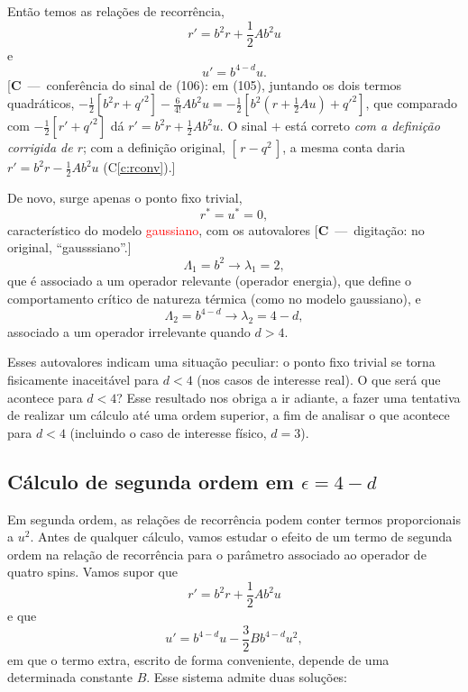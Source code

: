 \documentclass[12pt,a4paper]{article}
\newcommand{\corr}[1]{\textcolor{red}{#1}}
\newcounter{corr}
\newcommand{\nota}[2]{\refstepcounter{corr}\label{#1}%
  {\color{red}\small[\textbf{C\thecorr}~---~#2]}}
\begin{document}
Então temos as relações de recorrência,
\begin{equation}
r'=b^2r+\frac12Ab^2u
\end{equation}
e
\begin{equation}
u'=b^{4-d}u.
\end{equation}
\nota{c:rec106}{conferência do sinal de (106): em (105), juntando os dois termos quadráticos,
$-\tfrac12\left[b^2r+q'^2\right]-\tfrac{6}{4!}Ab^2u=-\tfrac12\left[b^2\left(r+\tfrac12Au\right)+q'^2\right]$,
que comparado com $-\tfrac12[r'+q'^2]$ dá $r'=b^2r+\tfrac12Ab^2u$. O sinal $+$ está correto
\emph{com a definição corrigida de $r$}; com a definição original, $[\,r-q^2\,]$, a mesma conta daria
$r'=b^2r-\tfrac12Ab^2u$ (C\ref{c:rconv}).}

De novo, surge apenas o ponto fixo trivial,
\begin{equation}
r^*=u^*=0,
\end{equation}
característico do modelo \corr{gaussiano}, com os autovalores
\nota{c:gauss}{digitação: no original, ``gausssiano''.}
\begin{equation}
\Lambda_1=b^2\to\lambda_1=2,
\end{equation}
que é associado a um operador relevante (operador energia), que define o
comportamento crítico de natureza térmica (como no modelo gaussiano), e
\begin{equation}
\Lambda_2=b^{4-d}\to\lambda_2=4-d,
\end{equation}
associado a um operador irrelevante quando $d>4$.

Esses autovalores indicam uma situação peculiar: o ponto fixo trivial se
torna fisicamente inaceitável para $d<4$ (nos casos de interesse real). O
que será que acontece para $d<4$? Esse resultado nos obriga a ir adiante,
a fazer uma tentativa de realizar um cálculo até uma ordem superior, a fim
de analisar o que acontece para $d<4$ (incluindo o caso de interesse físico,
$d=3$).

\subsection{Cálculo de segunda ordem em $\epsilon=4-d$}

Em segunda ordem, as relações de recorrência podem conter termos
proporcionais a $u^2$. Antes de qualquer cálculo, vamos estudar o efeito de um termo
de segunda ordem na relação de recorrência para o parâmetro associado ao
operador de quatro spins. Vamos supor que
\begin{equation}
r'=b^2r+\frac12Ab^2u
\end{equation}
e que
\begin{equation}
u'=b^{4-d}u-\frac32Bb^{4-d}u^2,
\end{equation}
em que o termo extra, escrito de forma conveniente, depende de uma
determinada constante $B$. Esse sistema admite duas soluções:
\end{document}
